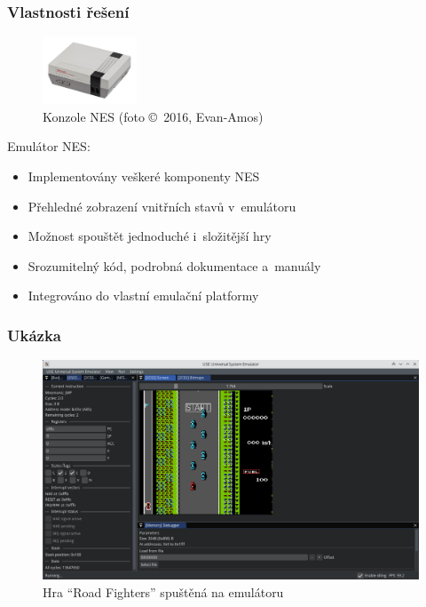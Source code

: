 \documentclass{beamer}
\begin{document}
\begin{frame}
	\frametitle{Vlastnosti řešení}
	\begin{figure}
		\centering
		\includegraphics[width=0.25\textwidth]{images/nes.jpg}
		\caption{Konzole NES (foto \copyright~2016, Evan-Amos)}
	\end{figure}
	Emulátor NES:
	\begin{itemize}
		\item Implementovány veškeré komponenty NES
		\item Přehledné zobrazení vnitřních stavů v~emulátoru
		\item Možnost spouštět jednoduché i~složitější hry
		\item Srozumitelný kód, podrobná dokumentace a~manuály
		\item Integrováno do vlastní emulační platformy
	\end{itemize}
\end{frame}

\begin{frame}
	\frametitle{Ukázka}
	\begin{figure}
		\centering
		\includegraphics[width=1\textwidth]{images/ss_nes_game_loaded.png}
		\caption{\small Hra \enquote{Road Fighters} spuštěná na emulátoru}
	\end{figure}
\end{frame}
\end{document}
